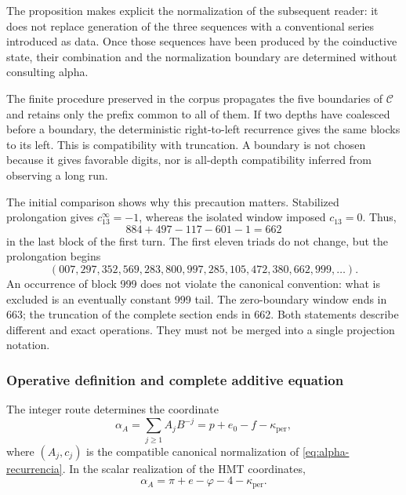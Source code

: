 The proposition makes explicit the normalization of the subsequent reader: it does
not replace generation of the three sequences with a conventional series
introduced as data. Once those sequences have been produced by the coinductive
state, their combination and the normalization boundary are
determined without consulting alpha.

The finite procedure preserved in the corpus propagates the five
boundaries of \(\mathcal C\) and retains only the prefix common to
all of them. If two depths have coalesced before a boundary,
the deterministic right-to-left recurrence gives the same blocks
to its left. This is compatibility with truncation. A boundary is not
chosen because it gives favorable digits, nor is all-depth
compatibility inferred from observing a long run.

The initial comparison shows why this precaution matters. Stabilized
prolongation gives \(c_{13}^{\infty}=-1\), whereas
the isolated window imposed \(c_{13}=0\). Thus,
\[
 884+497-117-601-1=662
\]
in the last block of the first turn. The first eleven triads do not
change, but the prolongation begins
\[
 (007,297,352,569,283,800,997,285,105,472,380,662,999,\ldots).
\]
An occurrence of block 999 does not violate the canonical convention: what
is excluded is an eventually constant 999 tail. The zero-boundary
window ends in 663; the truncation of the complete section
ends in 662. Both statements describe different and exact
operations. They must not be merged into a single projection notation.

\subsubsection{Operative definition and complete additive equation}
\label{subsec:alpha-definicion}

\begin{definition}
\label{def:alpha-operativa}
The integer route determines the coordinate
\begin{equation}
 \alpha_A=\sum_{j\geq1}A_jB^{-j}
 =p+e_0-f-\kappa_{\mathrm{per}},
 \label{eq:alpha-via-a}
\end{equation}
where \((A_j,c_j)\) is the compatible canonical normalization of
\eqref{eq:alpha-recurrencia}. In the scalar realization of the
HMT coordinates,
\begin{equation}
 \boxed{\alpha_A=
 \pi+e-\varphi
 -4-\kappa_{\mathrm{per}}.}
 \label{eq:alpha-identidad-completa}
\end{equation}
\end{definition}

